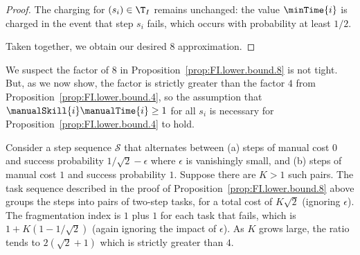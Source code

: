 \begin{proof}
    The charging for $(s_i) \in \T_I$ remains unchanged: the value $\minTime{i}$ is charged in the event that step $s_i$ fails, which occurs with probability at least $1/2$.

    Taken together, we obtain our desired $8$ approximation.
\end{proof}

We suspect the factor of $8$ in Proposition~\ref{prop:FI.lower.bound.8} is not tight. 
But, as we now show, the factor is strictly greater than the factor $4$ from Proposition~\ref{prop:FI.lower.bound.4}, so the assumption that $\manualSkill{i}\manualTime{i} \geq 1$ for all $s_i$ is necessary for Proposition~\ref{prop:FI.lower.bound.4} to hold.

Consider a step sequence $\mathcal{S}$ that alternates between (a) steps of manual cost $0$ and success probability $1/\sqrt{2} - \epsilon$ where $\epsilon$ is vanishingly small, and (b) steps of manual cost $1$ and success probability $1$.  
Suppose there are $K > 1$ such pairs.  
The task sequence described in the proof of Proposition~\ref{prop:FI.lower.bound.8} above groups the steps into pairs of two-step tasks, for a total cost of $K \sqrt{2}$ (ignoring $\epsilon$).  
The fragmentation index is $1$ plus $1$ for each task that fails, which is $1 + K(1 - 1/\sqrt{2})$ (again ignoring the impact of $\epsilon$).  
As $K$ grows large, the ratio tends to $2(\sqrt{2}+1)$ which is strictly greater than $4$.